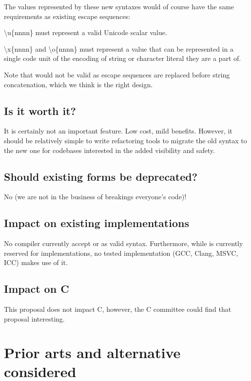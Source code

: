 \documentclass{wg21}
\begin{document}
The values represented by these new syntaxes would of course have the same requirements as existing escape sequences:

\textbackslash u\{nnnn\} must represent a valid Unicode scalar value.

\textbackslash x\{nnnn\} and \textbackslash o\{nnnn\} must represent a value that can be represented in a single code unit of the encoding of string or character literal they are a part of.

Note that  would not be valid as escape sequences are replaced before string concatenation, which we think is the right design.


\subsection{Is it worth it?}

It is certainly not an important feature. Low cost, mild benefits.
However, it should be relatively simple to write refactoring tools to migrate the old syntax to the new one for codebases interested in the added visibility and safety.


\subsection{Should existing forms be deprecated?}

No (we are not in the business of breakings everyone's code)!

\subsection{Impact on existing implementations}

No compiler currently accept  or  as valid syntax.
Furthermore, while  is currently reserved for implementations, no tested implementation (GCC, Clang, MSVC, ICC) makes use of it.


\subsection{Impact on C}

This proposal does not impact C, however, the C committee could find that proposal interesting.


\section{Prior arts and alternative considered}
\end{document}
